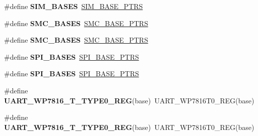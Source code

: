 \begin{DoxyCompactItemize}
\item 
\#define {\bfseries S\+I\+M\+\_\+\+B\+A\+S\+ES}~\hyperlink{group__SIM__Peripheral__Access__Layer_ga2fd213a3b9fc7d761ab0cdeb74c34f91}{S\+I\+M\+\_\+\+B\+A\+S\+E\+\_\+\+P\+T\+RS}\hypertarget{group__Backward__Compatibility__Symbols_gada0163d04c53251fcb36d06c0cc5fab9}{}\label{group__Backward__Compatibility__Symbols_gada0163d04c53251fcb36d06c0cc5fab9}

\item 
\#define {\bfseries S\+M\+C\+\_\+\+B\+A\+S\+ES}~\hyperlink{group__SMC__Peripheral__Access__Layer_gae583f3f0917ee513adcac36dd042a5f3}{S\+M\+C\+\_\+\+B\+A\+S\+E\+\_\+\+P\+T\+RS}\hypertarget{group__Backward__Compatibility__Symbols_ga3c3dac14aea70e071c763a0fd836963b}{}\label{group__Backward__Compatibility__Symbols_ga3c3dac14aea70e071c763a0fd836963b}

\item 
\#define {\bfseries S\+M\+C\+\_\+\+B\+A\+S\+ES}~\hyperlink{group__SMC__Peripheral__Access__Layer_gae583f3f0917ee513adcac36dd042a5f3}{S\+M\+C\+\_\+\+B\+A\+S\+E\+\_\+\+P\+T\+RS}\hypertarget{group__Backward__Compatibility__Symbols_ga3c3dac14aea70e071c763a0fd836963b}{}\label{group__Backward__Compatibility__Symbols_ga3c3dac14aea70e071c763a0fd836963b}

\item 
\#define {\bfseries S\+P\+I\+\_\+\+B\+A\+S\+ES}~\hyperlink{group__SPI__Peripheral__Access__Layer_ga3a16fecfe27c2052ab60e014be3f66f6}{S\+P\+I\+\_\+\+B\+A\+S\+E\+\_\+\+P\+T\+RS}\hypertarget{group__Backward__Compatibility__Symbols_ga10a4758c2218025a1cafc4ab139d074a}{}\label{group__Backward__Compatibility__Symbols_ga10a4758c2218025a1cafc4ab139d074a}

\item 
\#define {\bfseries S\+P\+I\+\_\+\+B\+A\+S\+ES}~\hyperlink{group__SPI__Peripheral__Access__Layer_ga3a16fecfe27c2052ab60e014be3f66f6}{S\+P\+I\+\_\+\+B\+A\+S\+E\+\_\+\+P\+T\+RS}\hypertarget{group__Backward__Compatibility__Symbols_ga10a4758c2218025a1cafc4ab139d074a}{}\label{group__Backward__Compatibility__Symbols_ga10a4758c2218025a1cafc4ab139d074a}

\item 
\#define {\bfseries U\+A\+R\+T\+\_\+\+W\+P7816\+\_\+\+T\+\_\+\+T\+Y\+P\+E0\+\_\+\+R\+EG}(base)~U\+A\+R\+T\+\_\+\+W\+P7816\+T0\+\_\+\+R\+EG(base)\hypertarget{group__Backward__Compatibility__Symbols_gadbc29832ac629b24c0cd4b7e3503d12b}{}\label{group__Backward__Compatibility__Symbols_gadbc29832ac629b24c0cd4b7e3503d12b}

\item 
\#define {\bfseries U\+A\+R\+T\+\_\+\+W\+P7816\+\_\+\+T\+\_\+\+T\+Y\+P\+E0\+\_\+\+R\+EG}(base)~U\+A\+R\+T\+\_\+\+W\+P7816\+T0\+\_\+\+R\+EG(base)\hypertarget{group__Backward__Compatibility__Symbols_gadbc29832ac629b24c0cd4b7e3503d12b}{}\label{group__Backward__Compatibility__Symbols_gadbc29832ac629b24c0cd4b7e3503d12b}


\end{DoxyCompactItemize}
